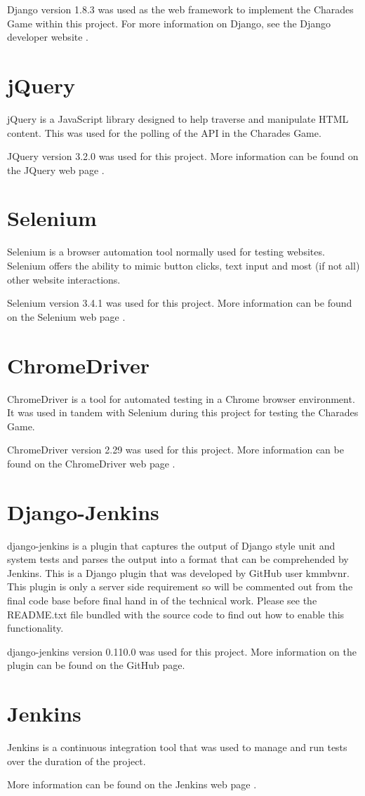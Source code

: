 Django version 1.8.3 was used as the web framework to implement the Charades Game within this project. For more information on Django, see the Django developer website \cite{django_dev}.

\section{jQuery}

jQuery is a JavaScript library designed to help traverse and manipulate HTML content. This was used for the polling of the API in the Charades Game.

JQuery version 3.2.0 was used for this project. More information can be found on the JQuery web page \cite{jquery}.

\section{Selenium}

Selenium is a browser automation tool normally used for testing websites. Selenium offers the ability to mimic button clicks, text input and most (if not all) other website interactions. 

Selenium version 3.4.1 was used for this project. More information can be found on the Selenium web page \cite{selenium}.

\section{ChromeDriver}

ChromeDriver is a tool for automated testing in a Chrome browser environment. It was used in tandem with Selenium during this project for testing the Charades Game. 

ChromeDriver version 2.29 was used for this project. More information can be found on the ChromeDriver web page \cite{chromedriver}.

\section{Django-Jenkins}

django-jenkins is a plugin that captures the output of Django style unit and system tests and parses the output into a format that can be comprehended by Jenkins. This is a Django plugin that was developed by GitHub user kmmbvnr. This plugin is only a server side requirement so will be commented out from the final code base before final hand in of the technical work. Please see the README.txt file bundled with the source code to find out how to enable this functionality.

django-jenkins version 0.110.0 was used for this project. More information on the plugin can be found on the GitHub page\cite{django-jenkins}.

\section{Jenkins}

Jenkins is a continuous integration tool that was used to manage and run tests over the duration of the project. 

More information can be found on the Jenkins web page \cite{jenkins}.